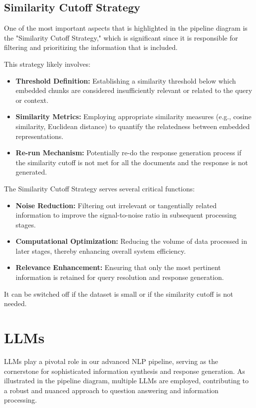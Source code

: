 \subsection{Similarity Cutoff Strategy}\label{subsec:similarity-cutoff-strategy}
One of the most important aspects that is highlighted in the pipeline diagram is the "Similarity Cutoff Strategy," which is significant since it is responsible for filtering and prioritizing the information that is included.

This strategy likely involves:
\begin{itemize}
    \item \textbf{Threshold Definition:} Establishing a similarity threshold below which embedded chunks are considered insufficiently relevant or related to the query or context.
    \item \textbf{Similarity Metrics:} Employing appropriate similarity measures (e.g., cosine similarity, Euclidean distance) to quantify the relatedness between embedded representations.
    \item \textbf{Re-run Mechanism:} Potentially re-do the response generation process if the similarity cutoff is not met for all the documents and the response is not generated.
\end{itemize}

The Similarity Cutoff Strategy serves several critical functions:
\begin{itemize}
    \item \textbf{Noise Reduction:} Filtering out irrelevant or tangentially related information to improve the signal-to-noise ratio in subsequent processing stages.
    \item \textbf{Computational Optimization:} Reducing the volume of data processed in later stages, thereby enhancing overall system efficiency.
    \item \textbf{Relevance Enhancement:} Ensuring that only the most pertinent information is retained for query resolution and response generation.
\end{itemize}

It can be switched off if the dataset is small or if the similarity cutoff is not needed.

\section{LLMs}\label{sec:large-language-models-llms-in-the-pipeline}
\ac{LLMs} play a pivotal role in our advanced NLP pipeline, serving as the cornerstone for sophisticated information synthesis and response generation.
As illustrated in the pipeline diagram, multiple LLMs are employed, contributing to a robust and nuanced approach to question answering and information processing.

